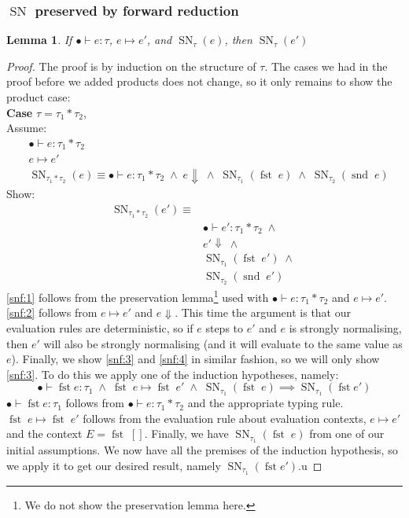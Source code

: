 \documentclass[a4paper,10pt,fleqn]{article}
\DeclareMathOperator{\SNPred}{SN}
\DeclareMathOperator{\fst}{fst}
\DeclareMathOperator{\snd}{snd}
\newcommand{\evalto}{\ensuremath{\mapsto}}
\newcommand{\mtenv}{\ensuremath{\bullet}}
\newcommand{\case}[1]{~\\{\bf Case} #1,~\\}
\newcommand{\SN}[2]{\ensuremath{\SNPred_{#1}(#2)}}
\newcommand{\pand}{\ensuremath{\; \wedge \;}}
\newtheorem*{lemma}{Lemma}
\begin{document}
\subsubsection*{$\SNPred$ preserved by forward reduction}
\begin{lemma}
  If $\mtenv \vdash e : \tau$, $e \evalto e'$, and $\SN{\tau}{e}$, then $\SN{\tau}{e'}$
\end{lemma}
\begin{proof}
  The proof is by induction on the structure of $\tau$. The cases we had in the proof before we added products does not change, so it only remains to show the product case:
  \case{$\tau = \tau_1 * \tau_2$}
  Assume:
  \begin{align*}
    & \mtenv \vdash e : \tau_1 * \tau_2 \\
    & e \evalto e' \\
    & \SN{\tau_1*\tau_2}{e} \equiv \mtenv \vdash e : \tau_1 * \tau_2  \pand e \Downarrow \pand \SN{\tau_1}{\fst \; e} \pand \SN{\tau_2}{\snd \; e}
  \end{align*}
  Show:  
  \begin{align}
    \SN{\tau_1*\tau_2}{e'} \equiv & \nonumber \\
                                &\mtenv \vdash e' : \tau_1 * \tau_2  \pand \label{snf:1}\\
                                &e' \Downarrow \pand \label{snf:2}\\
                                &\SN{\tau_1}{\fst \; e'} \pand \label{snf:3} \\
                                &\SN{\tau_2}{\snd \; e'} \label{snf:4}
  \end{align}
  \ref{snf:1} follows from the preservation lemma\footnote{We do not show the preservation lemma here.} used with $\mtenv \vdash e : \tau_1 * \tau_2$ and $e \evalto e'$. \ref{snf:2} follows from $e \evalto e'$ and $e \Downarrow$. This time the argument is that our evaluation rules are deterministic, so if $e$ steps to $e'$ and $e$ is strongly normalising, then $e'$ will also be strongly normalising (and it will evaluate to the same value as $e$). Finally, we show \ref{snf:3} and \ref{snf:4} in similar fashion, so we will only show \ref{snf:3}. To do this we apply one of the induction hypotheses, namely:
\[
  \mtenv \vdash \fst e : \tau_1 \pand \fst \; e \evalto \fst \; e' \pand \SN{\tau_1}{\fst \; e} \implies \SN{\tau_1}{\fst e'}
\]
$\mtenv \vdash \fst e : \tau_1$ follows from $\mtenv \vdash e : \tau_1 * \tau_2$ and the appropriate typing rule. $\fst \; e \evalto \fst \; e'$ follows from the evaluation rule about evaluation contexts, $e \evalto e'$ and the context $E = \fst\; []$. Finally, we have $\SN{\tau_1}{\fst \; e}$ from one of our initial assumptions. We now have all the premises of the induction hypothesis, so we apply it to get our desired result, namely $\SN{\tau_1}{\fst e'}$.u
\end{proof}
\end{document}
